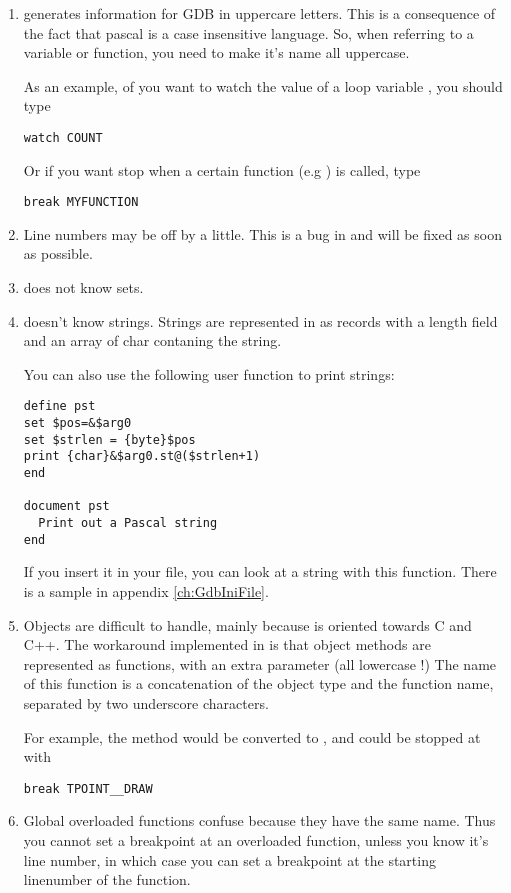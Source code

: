 \documentclass{report}
\begin{document}
\begin{enumerate}
\item \fpc generates information for GDB in uppercare letters. This is a
consequence of the fact that pascal is a case insensitive language. So, when
referring to a variable or function, you need to make it's name all
uppercase.

As an example, of you want to watch the value of a loop variable
, you should type
\begin{verbatim}
watch COUNT
\end{verbatim}
Or if you want stop when a certain function (e.g ) is called,
type
\begin{verbatim}
break MYFUNCTION
\end{verbatim}

\item Line numbers may be off by a little. This is a bug in \fpc and will be
fixed as soon as possible.

\item {} does not know sets.

\item {} doesn't know strings. Strings are represented in 
as records with a length field and an array of char contaning the string.

You can also use the following user function to print strings:
\begin{verbatim}
define pst
set $pos=&$arg0
set $strlen = {byte}$pos
print {char}&$arg0.st@($strlen+1)
end

document pst
  Print out a Pascal string
end
\end{verbatim}
If you insert it in your  file, you can look at a string with this
function. There is a sample  in appendix \ref{ch:GdbIniFile}.

\item Objects are difficult to handle, mainly because  is oriented
towards C and C++. The workaround implemented in \fpc is that object methods
are represented as functions, with an extra parameter  (all
lowercase !) The name of this function is a concatenation of the object type
and the function name, separated by two underscore characters.

For example, the method  would be converted to
, and could be stopped at with
\begin{verbatim}
break TPOINT__DRAW
\end{verbatim}

\item Global overloaded functions confuse  because they have the same
name. Thus you cannot set a breakpoint at an overloaded function, unless you
know it's line number, in which case you can set a breakpoint at the
starting linenumber of the function.
\end{enumerate}
\end{document}
